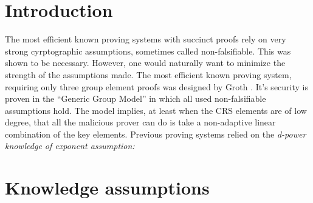 \documentclass[11pt]{article}
\numberwithin{figure}{section} %
\begin{document}
\section{Introduction}
The most efficient known proving systems with succinct proofs rely on very strong cyrptographic assumptions, sometimes called non-falsifiable. This was shown to be necessary. However, one would naturally want to minimize the strength of the assumptions made. The most efficient known proving system, requiring only three group element proofs was designed by Groth \cite{Groth16}. It's security is proven in the ``Generic Group Model'' in which all used non-falsifiable assumptions hold. The model implies, at least when the CRS elements are of low degree, that all the malicious prover can do is take a non-adaptive linear combination of the key elements.
Previous proving systems \cite{GGPR, PHGR} relied on the \emph{d-power knowledge of exponent assumption:}


\section{Knowledge assumptions}
\end{document}
